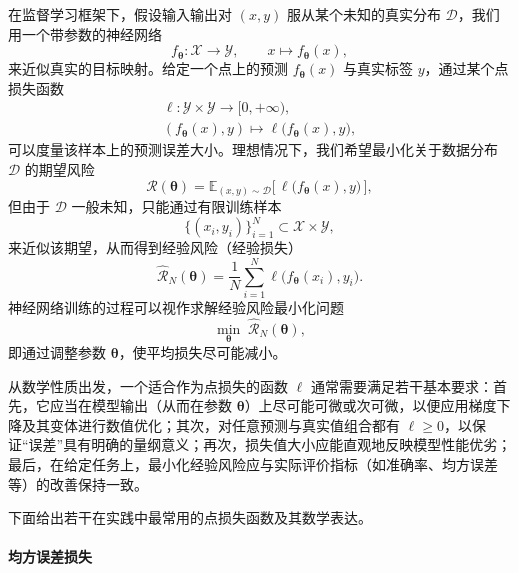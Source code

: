 在监督学习框架下，假设输入输出对 $(x,y)$ 服从某个未知的真实分布 $\mathcal{D}$，我们用一个带参数的神经网络
\begin{equation}
    f_{\bm{\theta}} : \mathcal{X} \to \mathcal{Y}, \qquad x \mapsto f_{\bm{\theta}}(x),
\end{equation}
来近似真实的目标映射。给定一个点上的预测 $f_{\bm{\theta}}(x)$ 与真实标签 $y$，通过某个点损失函数
\begin{equation}
    \begin{aligned}
        \ell : \mathcal{Y} \times \mathcal{Y} \to [0,+\infty), \\
        (f_{\bm{\theta}}(x), y) \mapsto \ell\bigl(f_{\bm{\theta}}(x),y\bigr),
    \end{aligned}
\end{equation}
可以度量该样本上的预测误差大小。理想情况下，我们希望最小化关于数据分布 $\mathcal{D}$ 的期望风险
\begin{equation}
    \mathcal{R}(\bm{\theta})
    = \mathbb{E}_{(x,y)\sim\mathcal{D}}
    \bigl[\,\ell\bigl(f_{\bm{\theta}}(x), y\bigr)\,\bigr],
\end{equation}
但由于 $\mathcal{D}$ 一般未知，只能通过有限训练样本
\begin{equation}
    \{(x_i,y_i)\}_{i=1}^{N} \subset \mathcal{X} \times \mathcal{Y},
\end{equation}
来近似该期望，从而得到经验风险（经验损失）
\begin{equation}
    \hat{\mathcal{R}}_N(\bm{\theta})
    = \frac{1}{N} \sum_{i=1}^{N}
    \ell\bigl(f_{\bm{\theta}}(x_i), y_i\bigr).
\end{equation}
神经网络训练的过程可以视作求解经验风险最小化问题
\begin{equation}
    \min_{\bm{\theta}} \; \hat{\mathcal{R}}_N(\bm{\theta}),
\end{equation}
即通过调整参数 $\bm{\theta}$，使平均损失尽可能减小。

从数学性质出发，一个适合作为点损失的函数 $\ell$ 通常需要满足若干基本要求：首先，它应当在模型输出（从而在参数 $\bm{\theta}$）上尽可能可微或次可微，以便应用梯度下降及其变体进行数值优化；其次，对任意预测与真实值组合都有 $\ell \ge 0$，以保证“误差”具有明确的量纲意义；再次，损失值大小应能直观地反映模型性能优劣；最后，在给定任务上，最小化经验风险应与实际评价指标（如准确率、均方误差等）的改善保持一致。

下面给出若干在实践中最常用的点损失函数及其数学表达。

\paragraph{均方误差损失}

